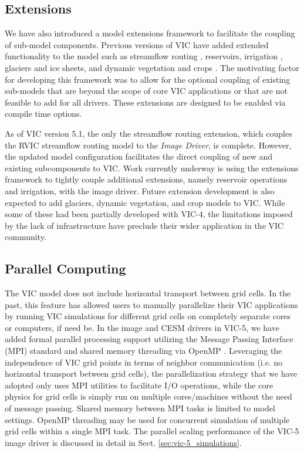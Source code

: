 \documentclass[gmd, manuscript]{copernicus}
\begin{document}
    \subsection{Extensions}
      \label{sec:extensions}
      We have also introduced a model extensions framework to facilitate the coupling of sub-model components. Previous versions of VIC have added extended functionality to the model such as streamflow routing \citep{Lohmann_1996}, reservoirs, irrigation \citep{Haddeland_2006}, glaciers and ice sheets, and dynamic vegetation and crops \citep{Adam_2015}. The motivating factor for developing this framework was to allow for the optional coupling of existing sub-models that are beyond the scope of core VIC applications or that are not feasible to add for all drivers. These extensions are designed to be enabled via compile time options.

      As of VIC version 5.1, the only the streamflow routing extension, which couples the RVIC streamflow routing model \citep{Hamman_2017a} to the \textit{Image Driver}, is complete. However, the updated model configuration facilitates the direct coupling of new and existing subcomponents to VIC. Work currently underway is using the extensions framework to tightly couple additional extensions, namely reservoir operations and irrigation, with the image driver. Future extension development is also expected to add glaciers, dynamic vegetation, and crop models to VIC. While some of these had been partially developed with VIC-4, the limitations imposed by the lack of infrastructure have preclude their wider application in the VIC community.

  \subsection{Parallel Computing}
    \label{sec:parallel}
    The VIC model does not include horizontal transport between grid cells. In the past, this feature has allowed users to manually parallelize their VIC applications by running VIC simulations for different grid cells on completely separate cores or computers, if need be. In the image and CESM drivers in VIC-5, we have added formal parallel processing support utilizing the Message Passing Interface (MPI) standard \citep{Gropp_1996} and shared memory threading via OpenMP \citep{Dagum_1998}. Leveraging the independence of VIC grid points in terms of neighbor communication (i.e. no horizontal transport between grid cells), the parallelization strategy that we have adopted only uses MPI utilities to facilitate I/O operations, while the core physics for grid cells is simply run on multiple cores/machines without the need of message passing. Shared memory between MPI tasks is limited to model settings. OpenMP threading may be used for concurrent simulation of multiple grid cells within a single MPI task. The parallel scaling performance of the VIC-5 image driver is discussed in detail in Sect. \ref{sec:vic-5_simulations}.
\end{document}
